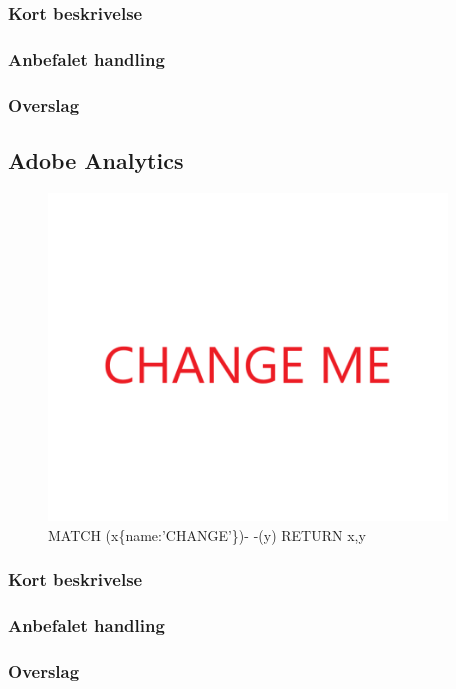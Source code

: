 \documentclass{article}
\begin{document}
\subsubsection{Kort beskrivelse}
\subsubsection{Anbefalet handling}
\subsubsection{Overslag}


\subsection{Adobe Analytics}
\begin{figure}[h]
\includegraphics[width=300pt]{CHANGE.PNG}
\caption{MATCH (x\{name:'CHANGE'\})- -(y) RETURN x,y}
\end{figure}
\subsubsection{Kort beskrivelse}
\subsubsection{Anbefalet handling}
\subsubsection{Overslag}
\end{document}
